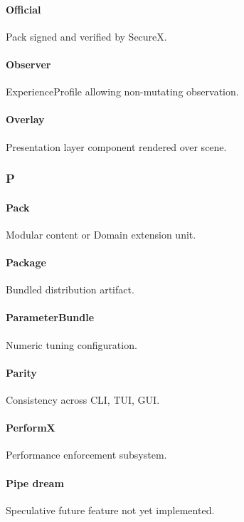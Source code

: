 \documentclass[9pt,a4paper,openany]{book}
\begin{document}
\paragraph{Official}
Pack signed and verified by SecureX.\allowbreak{}


\paragraph{Observer}
ExperienceProfile allowing non-\allowbreak{}mutating observation.\allowbreak{}


\paragraph{Overlay}
Presentation layer component rendered over scene.\allowbreak{}


\subsubsection{P}

\paragraph{Pack}
Modular content or Domain extension unit.\allowbreak{}


\paragraph{Package}
Bundled distribution artifact.\allowbreak{}


\paragraph{ParameterBundle}
Numeric tuning configuration.\allowbreak{}


\paragraph{Parity}
Consistency across CLI, TUI, GUI.\allowbreak{}


\paragraph{PerformX}
Performance enforcement subsystem.\allowbreak{}


\paragraph{Pipe dream}
Speculative future feature not yet implemented.\allowbreak{}
\end{document}
